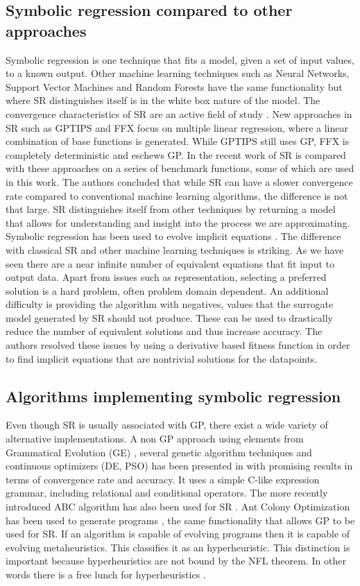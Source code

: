 \subsection{Symbolic regression compared to other approaches}
Symbolic regression is one technique that fits a model, given a set of input values, to a known output. Other machine learning techniques such as Neural Networks, Support Vector Machines and Random Forests have the same functionality but where SR distinguishes itself is in the white box nature of the model. The convergence characteristics of SR are an active field of study \citep{SRAccur}. New approaches in SR such as GPTIPS and FFX \citep{GPTIPS, FFX} focus on multiple linear regression, where a linear combination of base functions is generated. While GPTIPS still uses GP, FFX is completely deterministic and eschews GP.
In the recent work of \citep{SRlinear} SR is compared with these approaches on a series of benchmark functions, some of which are used in this work. The authors concluded that while SR can have a slower convergence rate compared to conventional machine learning algorithms, the difference is not that large. SR distinguishes itself from other techniques by returning a model that allows for understanding and insight into the process we are approximating.
Symbolic regression has been used to evolve implicit equations \citep{SRimplicit}. The difference with classical SR and other machine learning techniques is striking. As we have seen there are a near infinite number of equivalent equations that fit input to output data. Apart from issues such as representation, selecting a preferred solution is a hard problem, often problem domain dependent. An additional difficulty is providing the algorithm with negatives, values that the surrogate model generated by SR should not produce. These can be used to drastically reduce the number of equivalent solutions and thus increase accuracy. The authors resolved these issues by using a derivative based fitness function in order to find implicit equations that are nontrivial solutions for the datapoints.

\subsection{Algorithms implementing symbolic regression}
Even though SR is usually associated with GP, there exist a wide variety of alternative implementations.
A non GP approach using elements from Grammatical Evolution (GE) \cite{GE}, several genetic algorithm techniques and continuous optimizers (DE, PSO) has been presented in \citep{AEG} with promising results in terms of convergence rate and accuracy. 
It uses a simple C-like expression grammar, including relational and conditional operators. 
The more recently introduced ABC algorithm has also been used for SR \cite{ABCSR}. 
Ant Colony Optimization \citep{ACO} has been used to generate programs \citep{ACOSR}, the same functionality that allows GP to be used for SR.
If an algorithm is capable of evolving programs then it is capable of evolving metaheuristics. This classifies it as an hyperheuristic. This distinction is important because hyperheuristics are not bound by the NFL theorem. In other words there is a free lunch for hyperheuristics \cite{HyperNFL}. 

